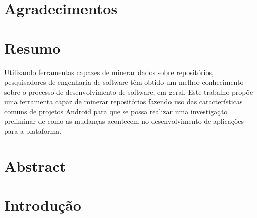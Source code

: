 \documentclass[a4paper,12pt]{article}
\numberwithin{figure}{section}
\begin{document}
\newpage
\section*{Agradecimentos}


\newpage
{} %
\section{Resumo}
Utilizando ferramentas capazes de minerar dados sobre repositórios, pesquisadores de engenharia de software têm obtido um melhor conhecimento sobre o processo de desenvolvimento de software, em geral. Este trabalho propõe uma ferramenta capaz de minerar repositórios fazendo uso das características comuns de projetos Android para que se possa realizar uma investigação preliminar de como as mudanças acontecem no desenvolvimento de aplicações para a plataforma. 


\newpage
\section{Abstract}


\newpage

\tableofcontents

\newpage
\section{Introdução}
\end{document}
